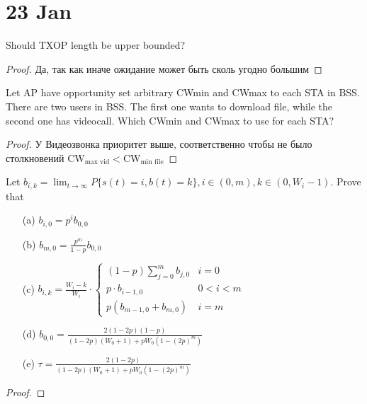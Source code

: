 \section{23 Jan}

\begin{prob}
Should TXOP length be upper bounded?
\end{prob}

\begin{proof}
Да, так как иначе ожидание может быть сколь угодно большим
\end{proof}
\vskip 0.6in



\begin{prob}
Let AP have opportunity set arbitrary CWmin and CWmax to each STA in BSS. There are two users in BSS. The first one wants to download file, while the second one has videocall. Which CWmin and CWmax to use for each STA?
\end{prob}

\begin{proof}
У Видеозвонка приоритет выше, соответственно чтобы не было столкновений $\text{CW}_{\max \text{ vid}} < \text{CW}_{\min \text{ file}}$ 
\end{proof}
\vskip 0.6in



\begin{prob}
Let $b_{i, k}=\lim _{t \longrightarrow \infty} P\{s(t)=i, b(t)=k\}, i \in(0, m), k \in\left(0, W_i-1\right)$. Prove that
\begin{itemize}
\item[(a)]  $b_{i, 0}=p^i b_{0,0}$
\item[(b)] $b_{m, 0}=\frac{p^m}{1-p} b_{0,0}$
\item[(c)] $b_{i, k}=\frac{W_i-k}{W_i} \cdot \begin{cases}(1-p) \sum_{j=0}^m b_{j, 0} & i=0 \\ p \cdot b_{i-1,0} & 0<i<m \\ p\left(b_{m-1,0}+b_{m, 0}\right) & i=m\end{cases}$
\item[(d)] $b_{0,0}=\frac{2(1-2 p)(1-p)}{(1-2 p)\left(W_0+1\right)+p W_0\left(1-(2 p)^m\right)}$
\item[(e)] $\tau=\frac{2(1-2 p)}{(1-2 p)\left(W_0+1\right)+p W_0\left(1-(2 p)^m\right)}$
\end{itemize}
\end{prob}

\begin{proof}

\end{proof}
\vskip 0.6in



